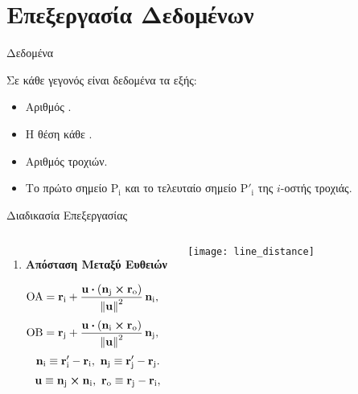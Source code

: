 \section{Επεξεργασία Δεδομένων}

\begin{frame}{Δεδομένα}
	
	Σε κάθε γεγονός είναι δεδομένα τα εξής:
	\vspace{4mm}
	\begin{itemize}
		\item Αριθμός \dvtrue.
		\item Η θέση κάθε \dvtrue.
		\item Αριθμός τροχιών.
		\item Το πρώτο σημείο $\mathrm{P_i}$ και το τελευταίο σημείο $\mathrm{P'_i}$ της $i$-οστής τροχιάς.
	\end{itemize}
\end{frame}

\beamerdefaultoverlayspecification{}

\begin{frame}{Διαδικασία Επεξεργασίας}
	
	\begin{columns}
		\begin{enumerate}
		\item \textbf{Απόσταση Mεταξύ Eυθειών}
			
			\begin{equation*}
				\vb{\mathrm{OA}} = \vb{r}_\mathrm{i} + \frac{\vb{u}\vdot(\vb{n}_\mathrm{j}\cross\vb{r}_\mathrm{o})}{\norm{\vb{u}}^2}\,\vb{n}_\mathrm{i}, \quad
			\end{equation*}
			\begin{equation*}
				\vb{\mathrm{OB}} = \vb{r}_\mathrm{j} + \frac{\vb{u}\vdot(\vb{n}_\mathrm{i}\cross\vb{r}_\mathrm{o})}{\norm{\vb{u}}^2}\,\vb{n}_\mathrm{j}, \quad
			\end{equation*}
			\vspace{0.05cm}
			\begin{equation*}
				\vb{n}_\mathrm{i} \equiv \vb{r}'_\mathrm{i} - \vb{r}_\mathrm{i}, \ \vb{n}_\mathrm{j} \equiv \vb{r}'_\mathrm{j} - \vb{r}_\mathrm{j}.
			\end{equation*}
			\begin{equation*}
				\vb{u} \equiv \vb{n}_\mathrm{j}\cross\vb{n}_\mathrm{i}, \ \vb{r}_\mathrm{o} \equiv \vb{r}_\mathrm{j} - \vb{r}_\mathrm{i},
			\end{equation*}
			\seti
		\end{enumerate}
		\texttt{[image: line\_distance]}
	\end{columns}
\end{frame}

